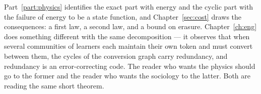 Part~\ref{part:physics} identifies the exact part with energy and the
cyclic part with the failure of energy to be a state function, and
Chapter~\ref{sec:cost} draws the consequences: a first law, a second law,
and a bound on erasure.
Chapter~\ref{ch:eng} does something different with the same
decomposition --- it observes that when several communities of learners
each maintain their own token and must convert between them, the cycles
of the conversion graph carry redundancy, and redundancy is an
error-correcting code.
The reader who wants the physics should go to the former and the reader
who wants the sociology to the latter.
Both are reading the same short theorem.

